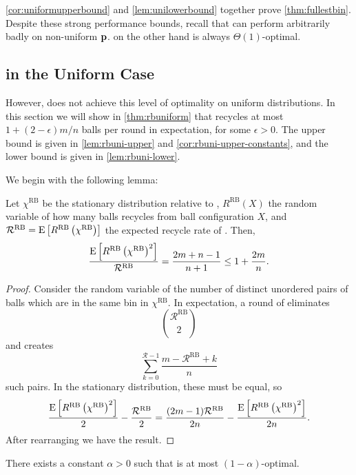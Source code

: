 \cref{cor:uniformupperbound} and \cref{lem:unilowerbound}
together prove \cref{thm:fullestbin}. Despite these strong
performance bounds, recall that \FB can perform arbitrarily badly on
non-uniform $\mathbf{p}$. \RB on the other hand is always $\Theta(1)$-optimal.

\subsection{\RB in the Uniform Case}

However, \RB{} does not achieve this level of optimality on uniform
distributions. In this section we will show in \cref{thm:rbuniform} that \RB
recycles at most $1+(2-\epsilon)m/n$ balls per round in expectation, for some
$\epsilon > 0$.  The upper bound is given in \cref{lem:rbuni-upper} and
\cref{cor:rbuni-upper-constants}, and the lower bound is given in
\cref{lem:rbuni-lower}.

We begin with the following lemma:

\begin{lemma}\label{lem:pair-flow}
	Let $\chi^\textrm{RB}$ be the stationary distribution relative to \RB,
	$R^\textrm{RB}(X)$ the random variable of how many balls \RB recycles from
	ball configuration $X$, and $\mathcal{R}^\textrm{RB} =
	\mathrm{E}\left[R^\textrm{RB}\left(\chi^\textrm{RB}\right)\right]$ the expected recycle rate
	of \RB. Then,
	\[ \frac{\mathrm{E}\left[R^\textrm{RB}\left(\chi^\textrm{RB}\right)^2\right]}{\mathcal{R}^\textrm{RB}} = \frac{2m+n-1}{n+1} \leq 1 + \frac{2m}{n}. \]
\end{lemma}

\begin{proof}
	Consider the random variable of the number of distinct unordered pairs of
	balls which are in the same bin in $\chi^\textrm{RB}$. In expectation, a
	round of \RB eliminates 
	\[\binom{\mathcal{R}^\textrm{RB}}{2}\]
	and creates
	\[\sum_{k=0}^{\mathcal{R} - 1} \frac{m - \mathcal{R}^\textrm{RB} + k}{n}\]
	such pairs. In the stationary distribution, these must be equal, so
        \[ \frac{\mathrm{E}\left[R^\textrm{RB}\left(\chi^\textrm{RB}\right)^2\right]}{2} - \frac{\mathcal{R}^\textrm{RB}}{2} = \frac{(2m-1)\mathcal{R}^\textrm{RB}}{2n} - \frac{\mathrm{E}\left[R^\textrm{RB}\left(\chi^\textrm{RB}\right)^2\right]}{2n}.\]
	After rearranging we have the result.
\end{proof}

\begin{lemma}\label{lem:rbuni-upper}
	There exists a constant $\alpha > 0$ such that \RB is at most
	$(1-\alpha)$-optimal.
\end{lemma}

